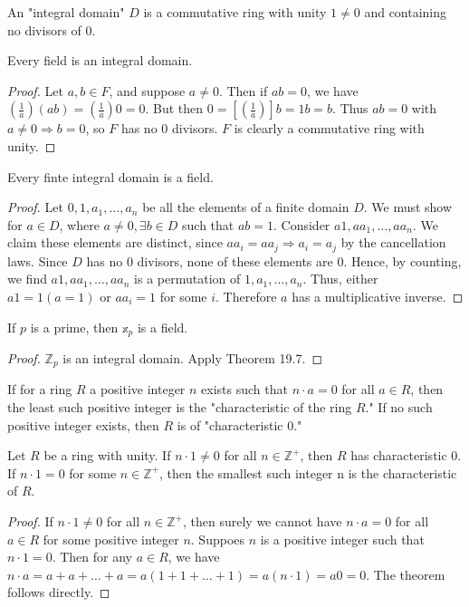 \documentclass[a4paper,11pt]{article}
\begin{document}
\begin{outline}
    An "integral domain" \(D\) is a commutative ring with unity \(1 \neq 0\) and containing no divisors of \(0\).
    
    Every field is an integral domain.
    
    \begin{proof}
      Let \(a, b \in F\), and suppose \(a \neq 0\). Then if \(ab = 0\), we have \((\frac{1}{a})(ab) = (\frac{1}{a})0 = 0\).
      But then \(0 = [(\frac{1}{a})]b = 1b = b\). Thus \(ab = 0\) with \(a \neq 0 \Rightarrow b = 0\), so \(F\) has no \(0\)
      divisors. \(F\) is clearly a commutative ring with unity.
    \end{proof}
    
    Every finte integral domain is a field.
    
    \begin{proof}
      Let \(0, 1, a_1, \ldots, a_n\) be all the elements of a finite domain \(D\). We must show for \(a \in D\), where
      \(a \neq 0, \exists b \in D\) such that \(ab = 1\). Consider \(a1, aa_1, \ldots, aa_n\). We claim these elements
      are distinct, since \(aa_i = aa_j \Rightarrow a_i = a_j\) by the cancellation laws. Since \(D\) has no \(0\) 
      divisors, none of these elements are \(0\). Hence, by counting, we find \(a1, aa_1, \ldots, aa_n\) is a permutation
      of \(1, a_1, \ldots, a_n\). Thus, either \(a1 = 1 (a = 1)\) or \(aa_i = 1\) for some \(i\). Therefore \(a\) has a
      multiplicative inverse.
    \end{proof}

    If \(p\) is a prime, then \(\mathbb{x}_p\) is a field.
    
    \begin{proof}
      \(\mathbb{Z}_p\) is an integral domain. Apply Theorem 19.7.
    \end{proof}
      
    If for a ring \(R\) a positive integer \(n\) exists such that \(n \cdot a = 0\) for all \(a \in R\),
    then the least such positive integer is the "characteristic of the ring \(R\)." If no such positive integer 
    exists, then \(R\) is of "characteristic 0."
      
    Let \(R\) be a ring with unity. If \(n \cdot 1 \neq 0\) for all \(n \in \mathbb{Z}^{+}\), then
    \(R\) has characteristic \(0\). If \(n \cdot 1 = 0\) for some \(n \in \mathbb{Z}^{+}\), then the smallest 
    such integer n is the characteristic of \(R\).
    
    \begin{proof}
      If \(n \cdot 1 \neq 0\) for all \(n \in \mathbb{Z}^{+}\), then surely we cannot have \(n \cdot a = 0\) for all 
      \(a \in R\) for some positive integer \(n\). Suppoes \(n\) is a positive integer such that \(n \cdot 1 = 0\). Then
      for any \(a \in R\), we have \(n \cdot a = a + a + \ldots + a = a(1 + 1 + \ldots + 1) = a(n \cdot 1) = a0 = 0\).
      The theorem follows directly.
    \end{proof}

\end{outline}
\end{document}
